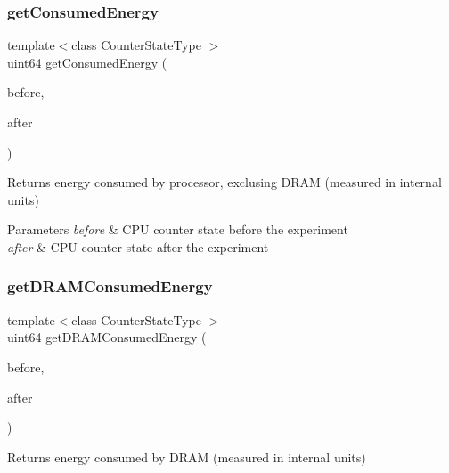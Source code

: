 \subsubsection{\texorpdfstring{get\+Consumed\+Energy}{getConsumedEnergy}}
{\footnotesize\ttfamily template$<$class Counter\+State\+Type $>$ \\
uint64 get\+Consumed\+Energy (\begin{DoxyParamCaption}\item[{const Counter\+State\+Type \&}]{before,  }\item[{const Counter\+State\+Type \&}]{after }\end{DoxyParamCaption})\hspace{0.3cm}{\ttfamily [friend]}}



Returns energy consumed by processor, exclusing D\+R\+AM (measured in internal units) 


\begin{DoxyParams}{Parameters}
{\em before} & C\+PU counter state before the experiment \\
\hline
{\em after} & C\+PU counter state after the experiment \\
\hline
\end{DoxyParams}
\mbox{\label{class_uncore_counter_state_a71af0766460ef7dd3d138ec0d0924eda}} 
\subsubsection{\texorpdfstring{get\+D\+R\+A\+M\+Consumed\+Energy}{getDRAMConsumedEnergy}}
{\footnotesize\ttfamily template$<$class Counter\+State\+Type $>$ \\
uint64 get\+D\+R\+A\+M\+Consumed\+Energy (\begin{DoxyParamCaption}\item[{const Counter\+State\+Type \&}]{before,  }\item[{const Counter\+State\+Type \&}]{after }\end{DoxyParamCaption})\hspace{0.3cm}{\ttfamily [friend]}}



Returns energy consumed by D\+R\+AM (measured in internal units) 


